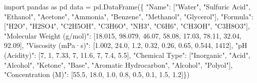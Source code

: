 \documentclass[
  letterpaper,
  DIV=11,
  numbers=noendperiod]{scrreprt}
\newenvironment{Shaded}{\begin{snugshade}}{\end{snugshade}}
\newcommand{\DecValTok}[1]{\textcolor[rgb]{0.68,0.00,0.00}{#1}}
\newcommand{\FloatTok}[1]{\textcolor[rgb]{0.68,0.00,0.00}{#1}}
\newcommand{\ImportTok}[1]{\textcolor[rgb]{0.00,0.46,0.62}{#1}}
\newcommand{\NormalTok}[1]{\textcolor[rgb]{0.00,0.23,0.31}{#1}}
\newcommand{\OperatorTok}[1]{\textcolor[rgb]{0.37,0.37,0.37}{#1}}
\newcommand{\StringTok}[1]{\textcolor[rgb]{0.13,0.47,0.30}{#1}}
\begin{document}
\begin{Shaded}
\begin{Highlighting}[]
\ImportTok{import}\NormalTok{ pandas }\ImportTok{as}\NormalTok{ pd}
\NormalTok{data }\OperatorTok{=}\NormalTok{ pd.DataFrame(\{}
    \StringTok{"Name"}\NormalTok{: [}\StringTok{"Water"}\NormalTok{, }\StringTok{"Sulfuric Acid"}\NormalTok{, }\StringTok{"Ethanol"}\NormalTok{, }\StringTok{"Acetone"}\NormalTok{, }\StringTok{"Ammonia"}\NormalTok{, }\StringTok{"Benzene"}\NormalTok{, }\StringTok{"Methanol"}\NormalTok{, }\StringTok{"Glycerol"}\NormalTok{],}
    \StringTok{"Formula"}\NormalTok{: [}\StringTok{"H2O"}\NormalTok{, }\StringTok{"H2SO4"}\NormalTok{, }\StringTok{"C2H5OH"}\NormalTok{, }\StringTok{"C3H6O"}\NormalTok{, }\StringTok{"NH3"}\NormalTok{, }\StringTok{"C6H6"}\NormalTok{, }\StringTok{"CH3OH"}\NormalTok{, }\StringTok{"C3H8O3"}\NormalTok{],}
    \StringTok{"Molecular Weight (g/mol)"}\NormalTok{: [}\FloatTok{18.015}\NormalTok{, }\FloatTok{98.079}\NormalTok{, }\FloatTok{46.07}\NormalTok{, }\FloatTok{58.08}\NormalTok{, }\FloatTok{17.03}\NormalTok{, }\FloatTok{78.11}\NormalTok{, }\FloatTok{32.04}\NormalTok{, }\FloatTok{92.09}\NormalTok{],}
    \StringTok{"Viscosity (mPa·s)"}\NormalTok{: [}\FloatTok{1.002}\NormalTok{, }\FloatTok{24.0}\NormalTok{, }\FloatTok{1.2}\NormalTok{, }\FloatTok{0.32}\NormalTok{, }\FloatTok{0.26}\NormalTok{, }\FloatTok{0.65}\NormalTok{, }\FloatTok{0.544}\NormalTok{, }\DecValTok{1412}\NormalTok{],}
    \StringTok{"pH (Acidity)"}\NormalTok{: [}\DecValTok{7}\NormalTok{, }\DecValTok{1}\NormalTok{, }\FloatTok{7.33}\NormalTok{, }\DecValTok{7}\NormalTok{, }\FloatTok{11.6}\NormalTok{, }\DecValTok{7}\NormalTok{, }\FloatTok{7.4}\NormalTok{, }\FloatTok{5.5}\NormalTok{],}
    \StringTok{"Chemical Type"}\NormalTok{: [}\StringTok{"Inorganic"}\NormalTok{, }\StringTok{"Acid"}\NormalTok{, }\StringTok{"Alcohol"}\NormalTok{, }\StringTok{"Ketone"}\NormalTok{, }\StringTok{"Base"}\NormalTok{, }\StringTok{"Aromatic Hydrocarbon"}\NormalTok{, }\StringTok{"Alcohol"}\NormalTok{, }\StringTok{"Polyol"}\NormalTok{],}
    \StringTok{"Concentration (M)"}\NormalTok{: [}\FloatTok{55.5}\NormalTok{, }\FloatTok{18.0}\NormalTok{, }\FloatTok{1.0}\NormalTok{, }\FloatTok{0.8}\NormalTok{, }\FloatTok{0.5}\NormalTok{, }\FloatTok{0.1}\NormalTok{, }\FloatTok{1.5}\NormalTok{, }\FloatTok{1.2}\NormalTok{]\})}
\end{Highlighting}
\end{Shaded}
\end{document}
